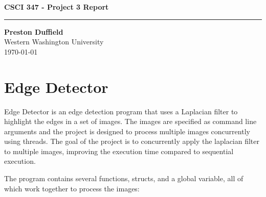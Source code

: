 \documentclass{article}
\begin{document}
\noindent
\begin{minipage}[t]{0.6\textwidth}
    \begin{flushleft}
        \LARGE\textbf{CSCI 347 - Project 3 Report} \\
        \vspace{6pt} %
        \hrule width 10cm
        \vspace{12pt}
        \large\textbf{Preston Duffield} \\
        \large Western Washington University \\
        \today
        \vspace{24pt}
    \end{flushleft}
\end{minipage}

\section*{Edge Detector}
Edge Detector is an edge detection program that uses a
Laplacian filter to highlight the edges in a set of images.
The images are specified as command line arguments and the project
is designed to process multiple images concurrently using threads.
The goal of the project is to concurrently apply the laplacian
filter to multiple images, improving the execution time
compared to sequential execution. \\
\begin{flushleft}
  The program contains several functions, structs,
  and a global variable, all of which work together to process the images:
\end{flushleft}
\end{document}

